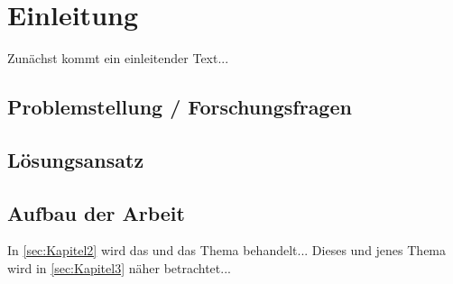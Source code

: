 


\chapter{Einleitung}
\label{sec:Einleitung} %



Zunächst kommt ein einleitender Text...

\section{Problemstellung / Forschungsfragen}

\section{Lösungsansatz}
\label{sec:loesungsansatz}

\section{Aufbau der Arbeit}
In \autoref{sec:Kapitel2} wird das und das Thema  behandelt...
Dieses und jenes Thema wird in \autoref{sec:Kapitel3} näher betrachtet...

\blindtext



 